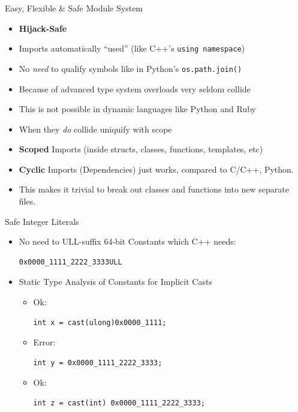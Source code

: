 \documentclass[xcolor=dvipsnames]{beamer}
\begin{document}
\begin{frame}[fragile]{Easy, Flexible \& Safe Module System}
  \begin{itemize}[<+->]
  \item \textbf{Hijack-Safe}
  \item Imports automatically ``used'' (like C++’s \texttt{using namespace})
  \item No \emph{need} to qualify symbols like in Python's \texttt{os.path.join()}
  \item Because of advanced type system overloads very seldom collide
  \item This is not possible in dynamic languages like Python and Ruby
  \item When they \emph{do} collide uniquify with scope
  \item \textbf{Scoped} Imports (inside structs, classes, functions, templates, etc)
  \item \textbf{Cyclic} Imports (Dependencies) just works, compared to C/C++,
    Python.
  \item This makes it trivial to break out classes and functions into new
    separate files.
  \end{itemize}
\end{frame}

\begin{frame}[fragile]{Safe Integer Literals}
  \begin{itemize}[<+->]
  \item No need to ULL-suffix 64-bit Constants which C++ needs:
\begin{lstlisting}[frame=single]
  0x0000_1111_2222_3333ULL
\end{lstlisting}
  \item Static Type Analysis of Constants for Implicit Casts
    \begin{itemize}[<+->]
    \item Ok:
\begin{lstlisting}[frame=single]
int x = cast(ulong)0x0000_1111;
\end{lstlisting}
    \item Error:
\begin{lstlisting}[frame=single]
int y = 0x0000_1111_2222_3333;
\end{lstlisting}
    \item Ok:
\begin{lstlisting}[frame=single]
int z = cast(int) 0x0000_1111_2222_3333;
\end{lstlisting}
    \end{itemize}
  \end{itemize}
\end{frame}
\end{document}
